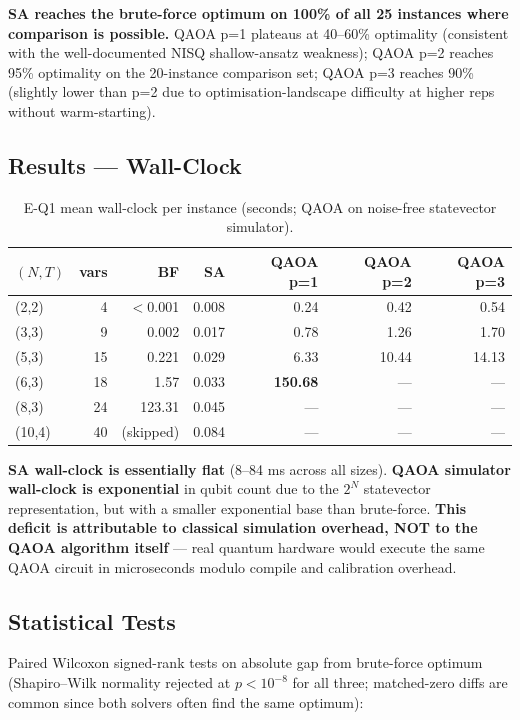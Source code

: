 \textbf{SA reaches the brute-force optimum on 100\% of all 25 instances where comparison is possible.} QAOA p=1 plateaus at 40--60\% optimality (consistent with the well-documented NISQ shallow-ansatz weakness); QAOA p=2 reaches 95\% optimality on the 20-instance comparison set; QAOA p=3 reaches 90\% (slightly lower than p=2 due to optimisation-landscape difficulty at higher reps without warm-starting).

\subsection{Results --- Wall-Clock}

\begin{table}[h!]
\centering
\caption{E-Q1 mean wall-clock per instance (seconds; QAOA on noise-free statevector simulator).}
\label{tab:eq1_walltime}
\begin{tabular}{lrrrrrr}
\hline
\textbf{$(N, T)$} & \textbf{vars} & \textbf{BF} & \textbf{SA} & \textbf{QAOA p=1} & \textbf{QAOA p=2} & \textbf{QAOA p=3} \\
\hline
(2,2)  &  4 & $<$0.001 & 0.008 &   0.24 &   0.42 &   0.54 \\
(3,3)  &  9 & 0.002    & 0.017 &   0.78 &   1.26 &   1.70 \\
(5,3)  & 15 & 0.221    & 0.029 &   6.33 &  10.44 &  14.13 \\
(6,3)  & 18 & 1.57     & 0.033 & \textbf{150.68} & --- & --- \\
(8,3)  & 24 & 123.31   & 0.045 & --- & --- & --- \\
(10,4) & 40 & (skipped) & 0.084 & --- & --- & --- \\
\hline
\end{tabular}
\end{table}

\textbf{SA wall-clock is essentially flat} (8--84 ms across all sizes). \textbf{QAOA simulator wall-clock is exponential} in qubit count due to the $2^N$ statevector representation, but with a smaller exponential base than brute-force. \textbf{This deficit is attributable to classical simulation overhead, NOT to the QAOA algorithm itself} --- real quantum hardware would execute the same QAOA circuit in microseconds modulo compile and calibration overhead.

\subsection{Statistical Tests}

Paired Wilcoxon signed-rank tests on absolute gap from brute-force optimum (Shapiro--Wilk normality rejected at $p < 10^{-8}$ for all three; matched-zero diffs are common since both solvers often find the same optimum):

